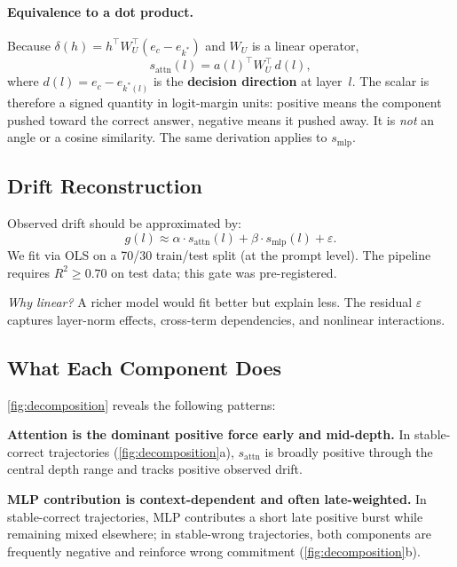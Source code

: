 \documentclass{article}
\begin{document}
\paragraph{Equivalence to a dot product.}
Because $\delta(h) = h^\top W_U^\top (e_c - e_{k^*})$ and $W_U$ is a linear operator,
\begin{equation}
  s_{\mathrm{attn}}(l) = a(l)^\top W_U^\top\, d(l),
  \label{eq:attn_dot}
\end{equation}
where $d(l) = e_c - e_{k^*(l)}$ is the \textbf{decision direction} at layer~$l$.  The scalar is therefore a signed quantity in logit-margin units: positive means the component pushed toward the correct answer, negative means it pushed away.  It is \emph{not} an angle or a cosine similarity.  The same derivation applies to $s_{\mathrm{mlp}}$.

\subsection{Drift Reconstruction}

Observed drift should be approximated by:
\begin{equation}
  g(l) \approx \alpha \cdot s_{\mathrm{attn}}(l) + \beta \cdot s_{\mathrm{mlp}}(l) + \varepsilon.
  \label{eq:decomposition}
\end{equation}
We fit via OLS on a 70/30 train/test split (at the prompt level).  The pipeline requires $R^2 \geq 0.70$ on test data; this gate was pre-registered.

\emph{Why linear?}  A richer model would fit better but explain less.  The residual $\varepsilon$ captures layer-norm effects, cross-term dependencies, and nonlinear interactions.

\subsection{What Each Component Does}

\cref{fig:decomposition} reveals the following patterns:

\textbf{Attention is the dominant positive force early and mid-depth.}  In stable-correct trajectories (\cref{fig:decomposition}a), $s_{\mathrm{attn}}$ is broadly positive through the central depth range and tracks positive observed drift.

\textbf{MLP contribution is context-dependent and often late-weighted.}  In stable-correct trajectories, MLP contributes a short late positive burst while remaining mixed elsewhere; in stable-wrong trajectories, both components are frequently negative and reinforce wrong commitment (\cref{fig:decomposition}b).
\end{document}
